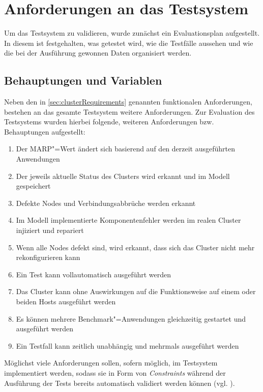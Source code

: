 \section{Anforderungen an das Testsystem}
\label{sec:evaluationPlan}

Um das Testsystem zu validieren, wurde zunächst ein Evaluationsplan aufgestellt.
In diesem ist festgehalten, was getestet wird, wie die Testfälle aussehen und wie die bei der Ausführung gewonnen Daten organisiert werden.

\subsection{Behauptungen und Variablen}
\label{sec:predictions}

Neben den in \autoref{sec:clusterRequirements} genannten funktionalen Anforderungen, bestehen an das gesamte Testsystem weitere Anforderungen.
Zur Evaluation des Testsystems wurden hierbei folgende, weiteren Anforderungen bzw. Behauptungen aufgestellt:

\begin{enumerate}
    \item Der \ac{MARP}"=Wert ändert sich basierend auf den derzeit ausgeführten Anwendungen
    \item Der jeweils aktuelle Status des Clusters wird erkannt und im Modell gespeichert
    \item Defekte Nodes und Verbindungsabbrüche werden erkannt
    \item Im Modell implementierte Komponentenfehler werden im realen Cluster injiziert und repariert
    \item Wenn alle Nodes defekt sind, wird erkannt, dass sich das Cluster nicht mehr rekonfigurieren kann
    \item Ein Test kann vollautomatisch ausgeführt werden
    \item Das Cluster kann ohne Auswirkungen auf die Funktionsweise auf einem oder beiden Hosts ausgeführt werden
    \item Es können mehrere Benchmark"=Anwendungen gleichzeitig gestartet und ausgeführt werden
    \item Ein Testfall kann zeitlich unabhängig und mehrmals ausgeführt werden
\end{enumerate}

Möglichst viele Anforderungen sollen, sofern möglich, im Testsystem implementiert werden, sodass sie in Form von \emph{Constraints} während der Ausführung der Tests bereits automatisch validiert werden können (vgl. ).

